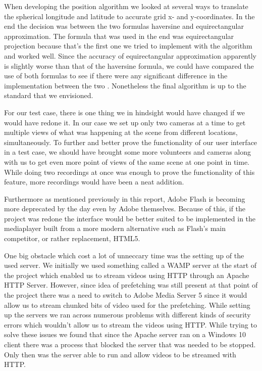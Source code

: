 \documentclass[9pt,a4paper]{acmproc}
\begin{document}
When developing the position algorithm we looked at several ways to translate the spherical longitude and latitude to accurate grid x- and y-coordinates. In the end the decision was between the two formulas haversine and equirectangular approximation. The formula that was used in the end was equirectangular projection because that’s the first one we tried to implement with the algorithm and worked well. Since the accuracy of equirectangular approximation apparently is slightly worse than that of the haversine formula, we could have compared the use of both formulas to see if there were any significant difference in the implementation between the two \cite{haversine}. Nonetheless the final algorithm is up to the standard that we envisioned. 

For our test case, there is one thing we in hindsight would have changed if we would have redone it. In our case we set up only two cameras at a time to get multiple views of what was happening at the scene from different locations, simultaneously. To further and better prove the functionality of our user interface in a test case, we should have brought some more volunteers and cameras along with us to get even more point of views of the same scene at one point in time. While doing two recordings at once was enough to prove the functionality of this feature, more recordings would have been a neat addition. 

Furthermore as mentioned previously in this report, Adobe Flash is becoming more deprecated by the day even by Adobe themselves. Because of this, if the project was redone the interface would be better suited to be implemented in the mediaplayer built from a more modern alternative such as Flash’s main competitor, or rather replacement, HTML5.

One big obstacle which cost a lot of unneccary time was the setting up of the used server. We initially we used something called a WAMP server at the start of the project which enabled us to stream videos using HTTP through an Apache HTTP Server. However, since idea of prefetching was still present at that point of the project there was a need to switch to Adobe Media Server 5 since it would allow us to stream chunked bits of video used for the prefetching. While setting up the servers we ran across numerous problems with different kinds of security errors which wouldn’t allow us to stream the videos using HTTP. While trying to solve these issues we found that since the Apache server ran on a Windows 10 client there was a process that blocked the server that was needed to be stopped. Only then was the server able to run and allow videos to be streamed with HTTP.
\end{document}
